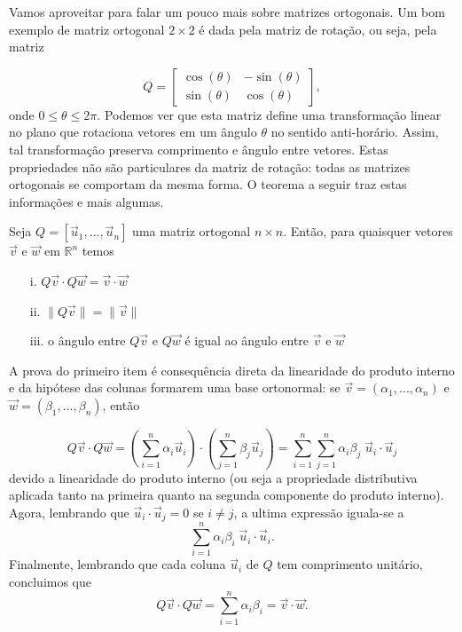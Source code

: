 \documentclass[../livro.tex]{subfiles}  %
\begin{document}
Vamos aproveitar para falar um pouco mais sobre matrizes ortogonais. Um bom exemplo de matriz ortogonal $2\times 2$ é dada pela matriz de rotação, ou seja, pela matriz

\begin{equation}
Q =
\begin{bmatrix}
\cos (\theta) & -\sin (\theta) \\
\sin (\theta) & \cos (\theta) 
\end{bmatrix} ,\end{equation}
onde $0 \leq \theta \leq 2 \pi$.
Podemos ver que esta matriz define uma transformação linear no plano que rotaciona vetores em um ângulo $\theta$ no sentido anti-horário.
Assim, tal transformação preserva comprimento e ângulo entre vetores.
Estas propriedades não são particulares da matriz de rotação: todas as matrizes ortogonais se comportam da mesma forma. O teorema a seguir traz estas informações e mais algumas.

\begin{theorem}
	Seja $Q=[\vec{u}_1,...,\vec{u}_n]$ uma matriz ortogonal $n \times n$. Então, para quaisquer vetores $\vec{v}$ e $\vec{w}$ em $\mathbb{R}^n$ temos
	\begin{enumerate}
		\item[i.] $Q\vec{v} \cdot Q\vec{w} = \vec{v} \cdot  \vec{w}$
		\item[ii.]  $\| Q\vec{v} \| = \| \vec{v} \|$
		\item[iii.]  o ângulo entre $Q\vec{v}$ e $Q\vec{w}$ é igual ao  ângulo entre $\vec{v}$ e $\vec{w}$
		\end{enumerate}
\end{theorem}

A prova do primeiro item é consequência direta da linearidade do produto interno e da hipótese das colunas formarem uma base ortonormal: se $\vec{v} = (\alpha_1,..., \alpha_n)$ e $\vec{w} = (\beta_1, ..., \beta_n)$,  então

\begin{equation}Q\vec{v} \cdot Q\vec{w} = \left( \sum_{i=1}^n \alpha_i \vec{u}_i \right) \cdot \left(   \sum_{j=1}^n \beta_j \vec{u}_j \right) =  \sum_{i=1}^n \sum_{j=1}^n \alpha_i \beta_j \;\vec{u}_i \cdot \vec{u}_j\end{equation} 
devido a linearidade do produto interno (ou seja a propriedade distributiva aplicada tanto na primeira quanto na segunda componente do produto interno). Agora, lembrando que $\vec{u}_i \cdot \vec{u}_j=0$ se $i \neq j$, a ultima expressão iguala-se a 
\begin{equation} \sum_{i=1}^n \alpha_i \beta_i \; \vec{u}_i \cdot \vec{u}_i.\end{equation}
Finalmente, lembrando que cada coluna $\vec{u}_i$ de $Q$ tem comprimento unitário, concluimos que
\begin{equation}Q\vec{v} \cdot Q\vec{w} = \sum_{i=1}^n \alpha_i \beta_i = \vec{v} \cdot \vec{w}.\end{equation}
 
\end{document}
